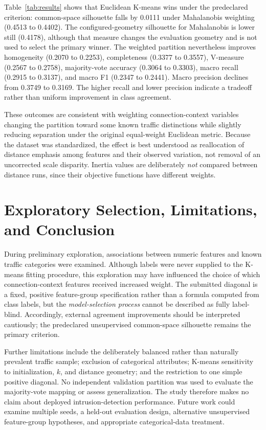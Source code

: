 \documentclass[conference]{IEEEtran}
\begin{document}
Table~\ref{tab:results} shows that Euclidean K-means wins under the predeclared criterion: common-space silhouette falls by 0.0111 under Mahalanobis weighting (0.4513 to 0.4402). The configured-geometry silhouette for Mahalanobis is lower still (0.4178), although that measure changes the evaluation geometry and is not used to select the primary winner. The weighted partition nevertheless improves homogeneity (0.2070 to 0.2253), completeness (0.3377 to 0.3557), V-measure (0.2567 to 0.2758), majority-vote accuracy (0.3064 to 0.3303), macro recall (0.2915 to 0.3137), and macro F1 (0.2347 to 0.2441). Macro precision declines from 0.3749 to 0.3169. The higher recall and lower precision indicate a tradeoff rather than uniform improvement in class agreement.

These outcomes are consistent with weighting connection-context variables changing the partition toward some known traffic distinctions while slightly reducing separation under the original equal-weight Euclidean metric. Because the dataset was standardized, the effect is best understood as reallocation of distance emphasis among features and their observed variation, not removal of an uncorrected scale disparity. Inertia values are deliberately \emph{not} compared between distance runs, since their objective functions have different weights.

\section{Exploratory Selection, Limitations, and Conclusion}
During preliminary exploration, associations between numeric features and known traffic categories were examined. Although labels were never supplied to the K-means fitting procedure, this exploration may have influenced the choice of which connection-context features received increased weight. The submitted diagonal is a fixed, positive feature-group specification rather than a formula computed from class labels, but the \emph{model-selection process} cannot be described as fully label-blind. Accordingly, external agreement improvements should be interpreted cautiously; the predeclared unsupervised common-space silhouette remains the primary criterion.

Further limitations include the deliberately balanced rather than naturally prevalent traffic sample; exclusion of categorical attributes; K-means sensitivity to initialization, $k$, and distance geometry; and the restriction to one simple positive diagonal. No independent validation partition was used to evaluate the majority-vote mapping or assess generalization. The study therefore makes no claim about deployed intrusion-detection performance. Future work could examine multiple seeds, a held-out evaluation design, alternative unsupervised feature-group hypotheses, and appropriate categorical-data treatment.
\end{document}
